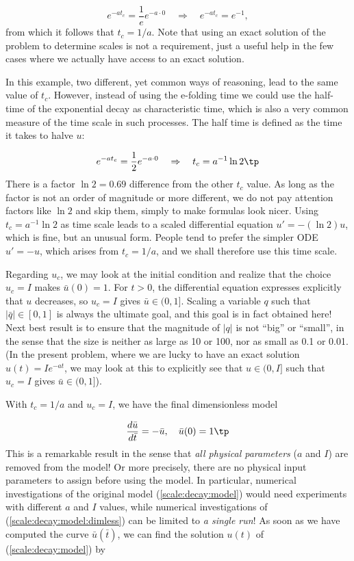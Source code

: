 \documentclass[graybox,envcountchap,sectrefs,final]{svmonodo}
\begin{document}
\[ e^{-at_c} = \frac{1}{e}e^{-a\cdot 0}\quad\Rightarrow\quad e^{-at_c}=e^{-1},
\]
from which it follows that $t_c = 1/a$.
Note that using an exact solution of the problem to determine
scales is not a requirement, just a useful help in the few cases where
we actually have access to an exact solution.

In this example, two different, yet common ways of reasoning, lead to the
same value of $t_c$. However, instead of using the e-folding time we
could use the half-time of the exponential decay as characteristic
time, which is also a very common measure of the time scale in such
processes. The half time is defined as the time it takes to halve $u$:

\[ e^{-at_c} = \frac{1}{2}e^{-a\cdot 0}
\quad\Rightarrow\quad t_c = a^{-1}\ln 2\tp\]
There is a factor $\ln 2 =0.69$ difference from the other $t_c$ value.
As long as the factor is not an order of magnitude or more different,
we do not pay attention factors like $\ln 2$ and skip them, simply to make
formulas look nicer. Using
$t_c = a^{-1}\ln 2$ as time scale
leads to a scaled differential equation $u'=-(\ln 2) u$,
which is fine, but an unusual form. People tend to prefer the simpler
ODE $u'=-u$,
which arises from $t_c=1/a$, and we shall therefore use this
time scale.

Regarding $u_c$, we may look at the initial condition and realize that
the choice $u_c=I$ makes $\bar u(0)=1$. For $t>0$, the differential
equation expresses explicitly that $u$ decreases, so $u_c=I$ gives
$\bar u\in (0, 1]$. Scaling a variable $q$ such that $|\bar q|\in
[0,1]$ is always the ultimate goal, and this goal is in fact obtained
here! Next best result is to ensure that the magnitude of $|q|$ is not
``big'' or ``small'', in the sense that the size is neither as large as
10 or 100, nor as small as
0.1 or 0.01.  (In the
present problem, where we are lucky to have an exact solution
$u(t)=Ie^{-at}$, we may look at this to explicitly see that $u\in
(0,I]$ such that $u_c=I$ gives $\bar u\in (0,1]$).

With $t_c=1/a$ and $u_c=I$, we have the final dimensionless model

\begin{equation}
\frac{d\bar u}{d\bar t} = -\bar u,\quad \bar u(0)=1
\tp
\label{scale:decay:model:dimless}
\end{equation}
This is a remarkable result in the sense that \emph{all physical parameters}
($a$ and $I$)
are removed from the model! Or more precisely, there are no physical input
parameters to assign
before using the model. In particular, numerical investigations of the original
model (\ref{scale:decay:model}) would need experiments with different
$a$ and $I$ values, while numerical investigations of
(\ref{scale:decay:model:dimless}) can be limited to \emph{a single run}! As soon
as we have computed the curve $\bar u(\bar t)$, we can find the
solution $u(t)$ of (\ref{scale:decay:model}) by
\end{document}

